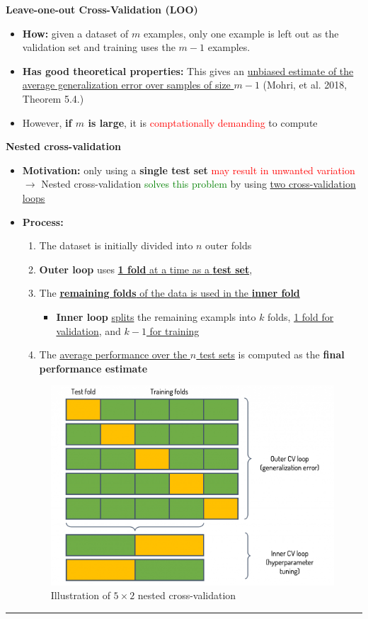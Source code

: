 \documentclass[12pt, a4paper]{article}
\begin{document}
\bigskip


\textbf{Leave-one-out Cross-Validation (LOO)}
\begin{itemize}
  \item \textbf{How:} given a dataset of $m$ examples, only one example is left out as the validation set and training uses the $m - 1$ examples.
  \item \textbf{Has good theoretical properties:} This gives an \uline{unbiased estimate of the average generalization error over samples of size $m - 1$} (Mohri, et al. 2018, Theorem 5.4.)
  \item However, \textbf{if $m$ is large}, it is \textcolor{red}{comptationally demanding} to compute
\end{itemize}


\bigskip


\textbf{Nested cross-validation}
\begin{itemize}
  \item \textbf{Motivation:} only using a \textbf{single test set} \textcolor{red}{may result in unwanted variation} $\rightarrow$ Nested cross-validation \textcolor{Green}{solves this problem} by using \uline{two cross-validation loops}
  \item \textbf{Process:}
  \begin{enumerate}
    \item The dataset is initially divided into $n$ outer folds
    \item \textbf{Outer loop} uses \uline{\textbf{1 fold} at a time as a \textbf{test set}},
    \item The \uline{\textbf{remaining folds} of the data is used in the \textbf{inner fold}}
    \begin{itemize}
      \item \textbf{Inner loop} \uline{splits} the remaining exampls into $k$ folds, \uline{1 fold for validation}, and \uline{$k - 1$ for training}
    \end{itemize}
    \item The \uline{average performance over the $n$ test sets} is computed as the \textbf{final performance estimate}
  \end{enumerate}
  \begin{figure}[H]
    \centering  %
      \includegraphics[width=0.8\columnwidth]{images/nested-cv.png}
      \caption{Illustration of $5 \times 2$ nested cross-validation}
      \label{fig:nested-cv}
  \end{figure}
\end{itemize}


\begin{center}\rule{3in}{0.4pt}\end{center}
\end{document}

